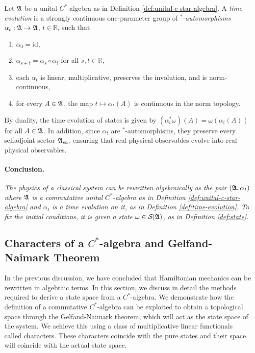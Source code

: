 	\begin{definition}\label{def:time-evolution}
		Let $\mathfrak{A}$ be a unital $C^*$-algebra as in Definition \ref{def:unital-c-star-algebra}. A \emph{time evolution} is a strongly continuous one-parameter group of \emph{$^*$-automorphisms} $\alpha_t:\mathfrak{A}\to\mathfrak{A}$, $t\in\mathbb{R}$, such that
		\begin{enumerate}
			\item $\alpha_0=\mathrm{id}$,
			\item $\alpha_{s+t}=\alpha_s\circ\alpha_t$ for all $s,t\in\mathbb{R}$,
			\item each $\alpha_t$ is linear, multiplicative, preserves the involution, and is norm-continuous,
			\item for every $A\in\mathfrak{A}$, the map $t\mapsto \alpha_t(A)$ is continuous in the norm topology.
		\end{enumerate}
	\end{definition}
	
	By duality, the time evolution of states is given by $(\alpha_t^*\omega)(A)=\omega(\alpha_t(A))$ for all $A\in\mathfrak{A}$. In addition, since $\alpha_t$ are $^*$-automorphisms, they preserve every selfadjoint sector $\mathfrak{A}_{sa}$, ensuring that real physical observables evolve into real physical observables.
	
	\smallskip
	\paragraph{Conclusion.} \emph{The physics of a classical system can be rewritten algebraically as the pair $(\mathfrak{A},\alpha_t)$ where $\mathfrak{A}$ is a commutative unital $C^*$-algebra as in Definition \ref{def:unital-c-star-algebra} and $\alpha_t$ is a time evolution on it, as in Definition \ref{def:time-evolution}. To fix the initial conditions, it is given a state $\omega \in \mathcal{S}(\A)$, as in Definition \ref{def:state}.}
	
	\subsection*{Characters of a $C^*$-algebra and Gelfand-Naimark Theorem}
	In the previous discussion, we have concluded that Hamiltonian mechanics can be rewritten in algebraic terms. In this section, we discuss in detail the methods required to derive a state space from a $C^*$-algebra. We demonstrate how the definition of a commutative $C^*$-algebra can be exploited to obtain a topological space through the Gelfand-Naimark theorem, which will act as the state space of the system. We achieve this using a class of multiplicative linear functionals called characters. These characters coincide with the pure states and their space will coincide with the actual state space.
	
